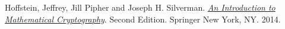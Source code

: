 \documentclass[12pt]{article}
\theoremstyle{plain}
\theoremstyle{definition}
\theoremstyle{remark}
\begin{document}
\begin{thebibliography}{13}

 Hoffstein, Jeffrey, Jill Pipher and Joseph H. Silverman. \href{https://link.springer.com/book/10.1007/978-1-4939-1711-2}{\textit{An Introduction to Mathematical Cryptography}}. Second Edition. Springer New York, NY. 2014.



 
\end{thebibliography}
\end{document}
